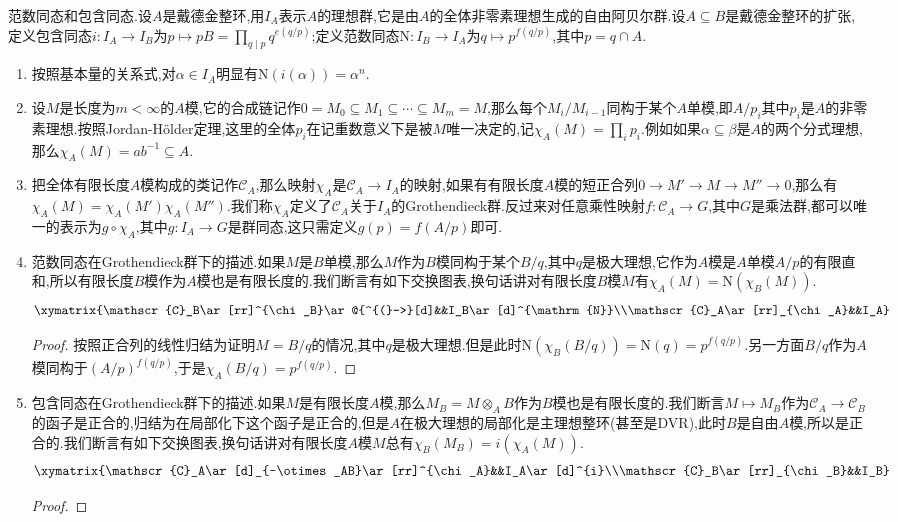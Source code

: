 范数同态和包含同态.设$A$是戴德金整环,用$I_A$表示$A$的理想群,它是由$A$的全体非零素理想生成的自由阿贝尔群.设$A\subseteq B$是戴德金整环的扩张,定义包含同态$i:I_A\to I_B$为$p\mapsto pB=\prod_{q\mid p}q^{e(q/p)}$;定义范数同态$\mathrm{N}:I_B\to I_A$为$q\mapsto p^{f(q/p)}$,其中$p=q\cap A$.
\begin{enumerate}
	\item 按照基本量的关系式,对$\alpha\in I_A$明显有$\mathrm{N}(i(\alpha))=\alpha^n$.
	\item 设$M$是长度为$m<\infty$的$A$模,它的合成链记作$0=M_0\subseteq M_1\subseteq\cdots\subseteq M_m=M$,那么每个$M_i/M_{i-1}$同构于某个$A$单模,即$A/p_i$其中$p_i$是$A$的非零素理想.按照Jordan-H\"older定理,这里的全体$p_i$在记重数意义下是被$M$唯一决定的,记$\chi_A(M)=\prod_ip_i$.例如如果$\alpha\subseteq\beta$是$A$的两个分式理想,那么$\chi_A(M)=ab^{-1}\subseteq A$.
	\item 把全体有限长度$A$模构成的类记作$\mathscr{C}_A$,那么映射$\chi_A$是$\mathscr{C}_A\to I_A$的映射,如果有有限长度$A$模的短正合列$0\to M'\to M\to M''\to0$,那么有$\chi_A(M)=\chi_A(M')\chi_A(M'')$.我们称$\chi_A$定义了$\mathscr{C}_A$关于$I_A$的Grothendieck群.反过来对任意乘性映射$f:\mathscr{C}_A\to G$,其中$G$是乘法群,都可以唯一的表示为$g\circ\chi_A$,其中$g:I_A\to G$是群同态,这只需定义$g(p)=f(A/p)$即可.
	\item 范数同态在Grothendieck群下的描述.如果$M$是$B$单模,那么$M$作为$B$模同构于某个$B/q$,其中$q$是极大理想,它作为$A$模是$A$单模$A/p$的有限直和,所以有限长度$B$模作为$A$模也是有限长度的.我们断言有如下交换图表,换句话讲对有限长度$B$模$M$有$\chi_A(M)=\mathrm{N}(\chi_B(M))$.
	$$\xymatrix{\mathscr{C}_B\ar[rr]^{\chi_B}\ar@{^{(}->}[d]&&I_B\ar[d]^{\mathrm{N}}\\\mathscr{C}_A\ar[rr]_{\chi_A}&&I_A}$$
	\begin{proof}
		
		按照正合列的线性归结为证明$M=B/q$的情况,其中$q$是极大理想.但是此时$\mathrm{N}(\chi_B(B/q))=\mathrm{N}(q)=p^{f(q/p)}$.另一方面$B/q$作为$A$模同构于$(A/p)^{f(q/p)}$,于是$\chi_A(B/q)=p^{f(q/p)}$.
	\end{proof}
	\item 包含同态在Grothendieck群下的描述.如果$M$是有限长度$A$模,那么$M_B=M\otimes_AB$作为$B$模也是有限长度的.我们断言$M\mapsto M_B$作为$\mathscr{C}_A\to\mathscr{C}_B$的函子是正合的,归结为在局部化下这个函子是正合的,但是$A$在极大理想的局部化是主理想整环(甚至是DVR),此时$B$是自由$A$模,所以是正合的.我们断言有如下交换图表,换句话讲对有限长度$A$模$M$总有$\chi_B(M_B)=i(\chi_A(M))$.
	$$\xymatrix{\mathscr{C}_A\ar[d]_{-\otimes_AB}\ar[rr]^{\chi_A}&&I_A\ar[d]^{i}\\\mathscr{C}_B\ar[rr]_{\chi_B}&&I_B}$$
	\begin{proof}
		

\end{proof}
\end{enumerate}
